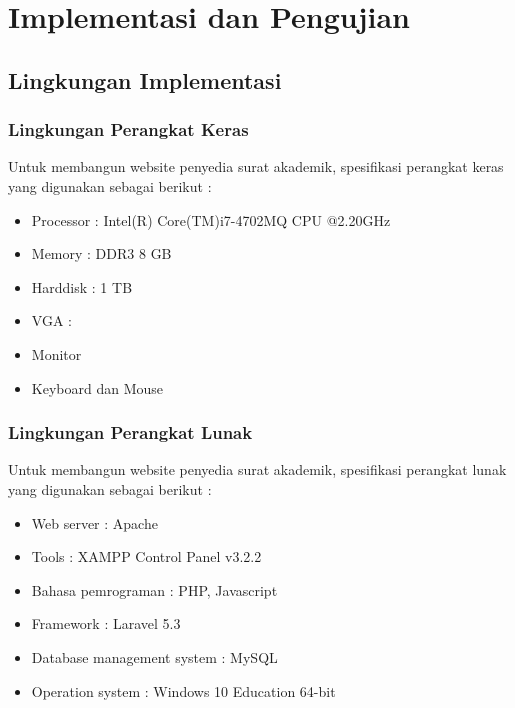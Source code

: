 \chapter{Implementasi dan Pengujian}
\label{chap:implementasi_dan_pengujian}

\section{Lingkungan Implementasi}
\label{sec:lingkungan_implementasi}

\subsection{Lingkungan Perangkat Keras}
\label{sec:lingkungan_perangkat_keras}
Untuk membangun website penyedia surat akademik, spesifikasi perangkat keras yang digunakan sebagai berikut :
\begin{itemize}
	\item Processor : Intel(R) Core(TM)i7-4702MQ CPU @2.20GHz
	\item Memory : DDR3 8 GB
	\item Harddisk : 1 TB
	\item VGA :
	\item Monitor
	\item Keyboard dan Mouse
\end{itemize}

\subsection{Lingkungan Perangkat Lunak}
\label{sec:lingkungan_perangkat_lunak}
Untuk membangun website penyedia surat akademik, spesifikasi perangkat lunak yang digunakan sebagai berikut :
\begin{itemize}
	\item Web server : Apache
	\item Tools : XAMPP Control Panel v3.2.2
	\item Bahasa pemrograman : PHP, Javascript
	\item Framework : Laravel 5.3
	\item Database management system : MySQL 
	\item Operation system : Windows 10 Education 64-bit
\end{itemize}